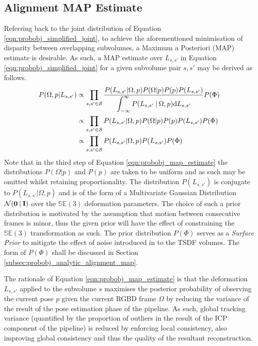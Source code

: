 \subsection{Alignment MAP Estimate}
\label{subsec:probobj_alignment_map}
Referring back to the joint distribution of Equation \ref{eqn:probobj_simplified_joint}, 
to achieve the aforementioned minimisation of disparity between overlapping subvolumes, 
a Maximum a Posteriori (MAP) estimate is desirable. As such, a MAP estimate over $L_{s, s'}$ 
in Equation \ref{eqn:probobj_simplified_joint} for a given subvolume pair $s, s'$ may be
derived as follows.
\begin{align}
  \label{eqn:probobj_map_estimate}
  P(\Omega, p | L_{s, s'}) & \propto \prod_{s, s' \in \mathcal{S}}
  \frac{P(L_{s, s'} | \Omega, p) 
  P(\Omega | p)P(p)P(L_{s, s'})}
  {\displaystyle\int_{-\infty}^{\infty} P(L_{s, s'} \:\vert\: \Omega, p)
  {\mathrm d{L_{s, s'}}}} P(\Phi) \\
  & \propto \prod_{s, s' \in \mathcal{S}} P(L_{s, s'} | \Omega, p) P(\Omega | p)
  P(p)P(L_{s, s'})P(\Phi) \\
  & \propto \prod_{s, s' \in \mathcal{S}} P(L_{s, s'} | \Omega, p)P(L_{s, s'})
  P(\Phi)
\end{align}
Note that in the third step of Equation \ref{eqn:probobj_map_estimate} the
distributions $P(\Omega | p)$ and $P(p)$ are taken to be uniform and as such may
be omitted whilst retaining proportionality. The distribution $P(L_{s, s'})$ is
conjugate to $P(L_{s, s'} | \Omega, p)$ and is of the form of a Multivariate
Gaussian Distribution $\mathcal{N}(\mathbf{0} \:\vert\: \mathbf{I})$ over the
$\mathbb{SE}(3)$ deformation parameters. The choice of such a prior distribution
is motivated by the assumption that motion between consecutive frames is minor,
thus the given prior will have the effect of constraining the $\mathbb{SE}(3)$
transformation as such. The prior distribution $P(\Phi)$ serves as a
\textit{Surface Prior} to mitigate the effect of noise introduced in to the TSDF
volumes. The form of $P(\Phi)$ shall be discussed in Section
\ref{subsec:probobj_analytic_alignment_map}.

The rationale of Equation \ref{eqn:probobj_map_estimate} is that the deformation
$L_{s, s'}$ applied to the subvolume $s$ maximises the posterior probability of
observing the current pose $p$ given the current RGBD frame $\Omega$ by reducing
the variance of the result of the pose estimation phase of the pipeline. As such,
global tracking variance (quantified by the proportion of outliers in the result
of the ICP component of the pipeline) is reduced by enforcing local consistency,
also improving global consistency and thus the quality of the resultant
reconstruction.


